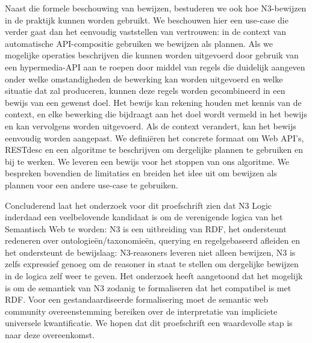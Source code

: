 Naast die formele beschouwing van bewijzen, bestuderen we ook hoe N3-bewijzen in de praktijk
kunnen worden gebruikt. We beschouwen hier een use-case die verder gaat dan het eenvoudig
vaststellen van vertrouwen: in de context van automatische API-compositie gebruiken we bewijzen
als plannen. Als we mogelijke operaties beschrijven die kunnen worden uitgevoerd door gebruik van
een hypermedia-API aan te roepen door middel van regels die duidelijk aangeven onder welke
omstandigheden de bewerking kan worden uitgevoerd en welke situatie dat zal produceren, kunnen
deze regels worden gecombineerd in een bewijs van een gewenst doel. Het bewijs kan rekening
houden met kennis van de context, en elke bewerking die bijdraagt aan het doel wordt vermeld in
het bewijs en kan vervolgens worden uitgevoerd. Als de context verandert, kan het bewijs eenvoudig
worden aangepast. We definiëren het concrete formaat om Web API's, RESTdesc en een algoritme te
beschrijven om dergelijke plannen te gebruiken en bij te werken. We leveren een bewijs voor 
het stoppen van ons algoritme. We bespreken bovendien de limitaties en breiden het idee uit om
bewijzen als plannen voor een andere use-case te gebruiken.

Concluderend laat het onderzoek voor dit proefschrift zien dat N3 Logic inderdaad een
veelbelovende kandidaat is om de verenigende logica van het Semantisch Web te worden: N3 is een
uitbreiding van RDF, het ondersteunt redeneren over ontologieën/taxonomieën, querying en
regelgebaseerd afleiden en het ondersteunt de bewijslaag: N3-reasoners leveren niet alleen
bewijzen, N3 is zelfs expressief genoeg om de reasoner in staat te stellen om dergelijke bewijzen in
de logica zelf weer te geven. Het onderzoek heeft aangetoond dat het mogelijk is om de semantiek
van N3 zodanig te formaliseren dat het compatibel is met RDF. Voor een gestandaardiseerde
formalisering moet de semantic web community overeenstemming bereiken over de interpretatie
van impliciete universele kwantificatie. We hopen dat dit proefschrift een waardevolle stap is naar
deze overeenkomst.




